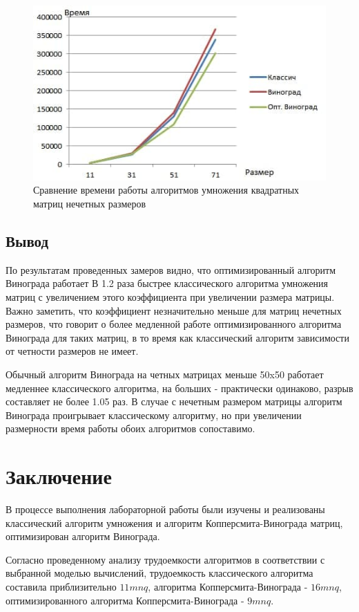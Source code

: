 \documentclass[12pt]{report}
\begin{document}
    \begin{figure}[H]
        \centering
        \includegraphics[width=0.75\linewidth]{img/graph_odd}
        \caption{Сравнение времени работы алгоритмов умножения квадратных матриц нечетных размеров}
        \label{fig:even_graph}
    \end{figure}


    \section{Вывод}
    По результатам проведенных замеров видно, что оптимизированный алгоритм Винограда
    работает В 1.2 раза быстрее классического алгоритма умножения матриц с увеличением этого
    коэффициента при увеличении размера матрицы.
    Важно заметить, что коэффициент незначительно меньше для матриц нечетных размеров,
    что говорит о более медленной работе оптимизированного алгоритма Винограда для таких матриц,
    в то время как классический алгоритм зависимости от четности размеров не имеет.

    Обычный алгоритм Винограда на четных матрицах меньше 50x50 работает медленнее классического алгоритма,
    на больших - практически одинаково, разрыв составляет не более 1.05 раз.
    В случае с нечетным размером матрицы алгоритм Винограда проигрывает классическому алгоритму,
    но при увеличении размерности время работы обоих алгоритмов сопоставимо.
    \newpage

    \chapter*{Заключение}
    В процессе выполнения лабораторной работы были изучены и реализованы классический алгоритм
    умножения и алгоритм Копперсмита-Винограда матриц, оптимизирован алгоритм Винограда.

    Согласно проведенному анализу трудоемкости алгоритмов в соответствии с выбранной моделью вычислений,
    трудоемкость классического алгоритма составила приблизительно $11mnq$,
    алгоритма Копперсмита-Винограда - $16mnq$,
    оптимизированного алгоритма Копперсмита-Винограда - $9mnq$.
\end{document}

